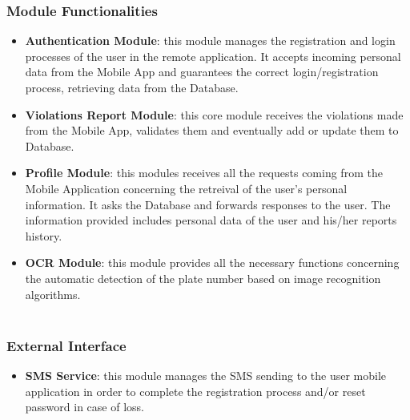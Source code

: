 \documentclass[12pt,a4paper]{article}
\begin{document}
\subsubsection*{Module Functionalities}
\begin{itemize}
\item \textbf{Authentication Module}: this module manages the registration and login processes of the user in the remote application. It accepts incoming personal data from the Mobile App and guarantees the correct login/registration process, retrieving data from the Database.
\item \textbf{Violations Report Module}: this core module receives the violations made from the Mobile App, validates them and eventually add or update them to Database.
\item \textbf{Profile Module}: this modules receives all the requests coming from the Mobile Application concerning the retreival of the  user's personal information. It asks the Database and forwards responses to the user. The information provided includes personal data of the user and his/her reports history.
\item \textbf{OCR Module}: this module provides all the necessary functions concerning the automatic detection of the plate number based on image recognition algorithms.\\\\
\end{itemize}
\subsubsection*{External Interface}
\begin{itemize}
\item \textbf{SMS Service}: this module manages the SMS sending to the user mobile application in order to complete the registration process and/or reset password in case of loss.
\end{itemize}
\newpage
\end{document}
